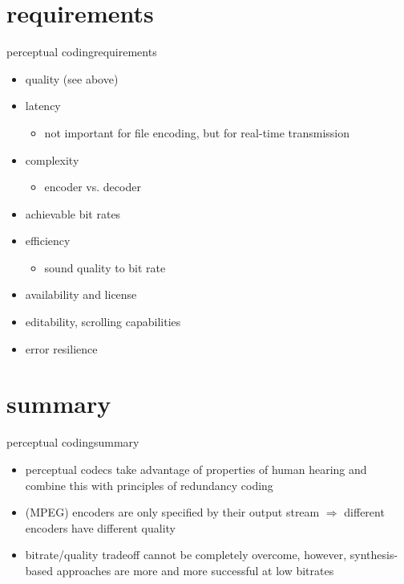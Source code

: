 \section{requirements}
	\begin{frame}{perceptual coding}{requirements}
        \begin{itemize}
            \item   quality (see above)
            \item	latency
                \begin{itemize}
                    \item   not important for file encoding, but for real-time transmission
                \end{itemize}
            \item	complexity
                \begin{itemize}
                    \item   encoder vs. decoder
                \end{itemize}
            \item   achievable bit rates
            \item   efficiency
                \begin{itemize}
                    \item   sound quality to bit rate
                \end{itemize}
            \item	availability and license
            \item   editability, scrolling capabilities
            \item   error resilience
		\end{itemize}
\end{frame}

\section{summary}
	\begin{frame}{perceptual coding}{summary}
        \begin{itemize}
            \item   perceptual codecs take advantage of properties of human hearing and combine this with principles of redundancy coding
            \item   (MPEG) encoders are only specified by their output stream $\Rightarrow$ different encoders have different quality
            \item   bitrate/quality tradeoff cannot be completely overcome, however, synthesis-based approaches  are more and more successful at low bitrates
		\end{itemize}
\end{frame}




